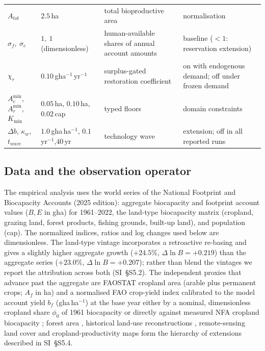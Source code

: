 \documentclass[preprint,12pt,authoryear]{elsarticle}
\newcommand{\Acmin}{A_c^{\min}}
\begin{document}
\begin{table}[!htbp]
\begin{tabularx}{\textwidth}{@{}>{\raggedright\arraybackslash}p{} >{\raggedright\arraybackslash}p{} >{\raggedright\arraybackslash}X >{\raggedright\arraybackslash}p{}@{}}
$A_{tot}$ & $2.5$\,ha & total bioproductive area & normalisation \\
$\sigma_f,\ \sigma_c$ & $1,\ 1$ (dimensionless) & human-available shares of annual account amounts & baseline ($<1$: reservation extension) \\
$\chi_r$ & $0.10$\,gha$^{-1}$\,yr$^{-1}$ & surplus-gated restoration coefficient & on with endogenous demand; off under frozen demand \\
$\Acmin$, $A_r^{\min}$,\newline $K_{\min}$ & $0.05$\,ha, $0.10$\,ha,\newline $0.02$\,cap & typed floors & domain constraints \\
$\Delta b$, $\kappa_w$,\newline $t_{wave}$ & $1.0$\,gha\,ha$^{-1}$, $0.1$\,yr$^{-1}$,\newline $40$\,yr & technology wave & extension; off in all reported runs \\
\bottomrule
\end{tabularx}
\end{table}

\subsection{Data and the observation operator}\label{sec:data}

The empirical analysis uses the world series of the National Footprint and Biocapacity Accounts (2025 edition): aggregate biocapacity and footprint account values ($B,E$ in gha) for 1961--2022, the land-type biocapacity matrix (cropland, grazing land, forest products, fishing grounds, built-up land), and population (cap). The normalized indices, ratios and log changes used below are dimensionless. The land-type vintage incorporates a retroactive re-basing and gives a slightly higher aggregate growth ($+24.5\%$, $\Delta\ln B=+0.219$) than the aggregate series ($+23.0\%$, $\Delta\ln B=+0.207$); rather than blend the vintages we report the attribution across both (SI~\S S5.2). The independent proxies that advance past the aggregate are FAOSTAT cropland area (arable plus permanent crops; $A_f$ in ha) and a normalised FAO crop-yield index calibrated to the model account yield $b_f$ (gha\,ha$^{-1}$) at the base year either by a nominal, dimensionless cropland share $\phi_0$ of 1961 biocapacity or directly against measured NFA cropland biocapacity \citep{FAO2023}; forest area \citep{FAO2020}, historical land-use reconstructions \citep{Hurtt2011,KleinGoldewijk2017}, remote-sensing land cover \citep{ESA2017,Copernicus2019} and cropland-productivity maps \citep{Monfreda2008} form the hierarchy of extensions described in SI~\S S5.4.
\end{document}
